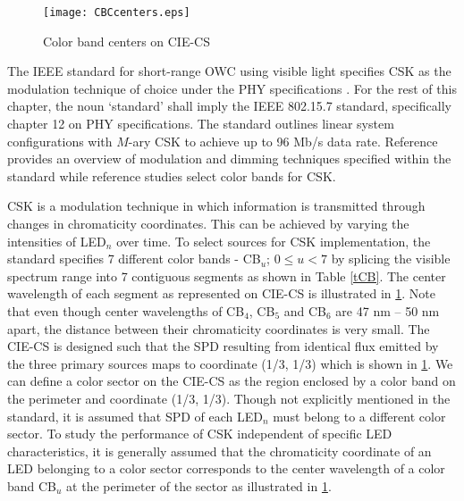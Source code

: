 \begin{figure}[!t]
\centering
		\texttt{[image: CBCcenters.eps]}
	\caption{Color band centers on CIE-CS}
	\label{figCBCcenters}
\end{figure}


The IEEE standard for short-range OWC using visible light specifies CSK as the modulation technique of choice under the PHY  specifications \cite{IEEE802.15.7}. For the rest of this chapter, the noun `standard' shall imply the IEEE 802.15.7 standard, specifically chapter 12 on PHY  specifications. The standard outlines linear system configurations with $M$-ary CSK to achieve up to 96 Mb/s data rate. Reference \cite{raj12a} provides an overview of modulation and dimming techniques specified within the standard while reference \cite{sin13a} studies select color bands for CSK.

CSK is a modulation technique in which information is transmitted through changes in chromaticity coordinates. This can be achieved by varying the intensities of LED$_{n}$ over time. To select sources for CSK implementation, the standard specifies 7 different color bands - CB$_{u}$; $0\leq u < 7$ by splicing the visible spectrum range into 7 contiguous segments as shown in Table \ref{tCB}. The center wavelength of each segment as represented on CIE-CS is illustrated in \figurename{ }\ref{figCBCcenters}. Note that even though center wavelengths of CB$_{4}$, CB$_{5}$ and CB$_{6}$ are 47 nm -- 50 nm apart, the distance between their chromaticity coordinates is very small. The CIE-CS is designed such that the SPD resulting from identical flux emitted by the three primary sources maps to coordinate (1/3, 1/3) which is shown in \figurename{ }\ref{figCBCcenters}. We can define a color sector on the CIE-CS as the region enclosed by a color band on the perimeter and coordinate (1/3, 1/3). Though not explicitly mentioned in the standard, it is assumed that SPD of each LED$_{n}$ must belong to a different color sector. To study the performance of CSK independent of specific LED characteristics, it is generally assumed that the chromaticity coordinate of an LED belonging to a color sector corresponds to the center wavelength of a color band CB$_{u}$ at the perimeter of the sector as illustrated in \figurename{ }\ref{figCBCcenters}.

